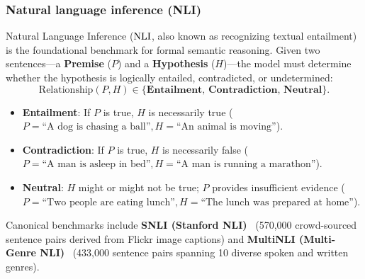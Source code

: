\documentclass[../../main.tex]{subfiles}
\begin{document}
\subsubsection{Natural language inference (NLI)}
\label{subsec:nli_reasoning}
Natural Language Inference ($\mathrm{NLI}$, also known as recognizing textual entailment) is the foundational benchmark for formal semantic reasoning. Given two sentences---a \textbf{Premise} ($P$) and a \textbf{Hypothesis} ($H$)---the model must determine whether the hypothesis is logically entailed, contradicted, or undetermined:
\begin{equation}
\label{eq:nli_labels}
\text{Relationship}(P, H) \in \{\textbf{Entailment}, \, \textbf{Contradiction}, \, \textbf{Neutral}\}.
\end{equation}
\begin{itemize}
    \item \textbf{Entailment}: If $P$ is true, $H$ is necessarily true ($P = \text{``A dog is chasing a ball''}, H = \text{``An animal is moving''}$).
    \item \textbf{Contradiction}: If $P$ is true, $H$ is necessarily false ($P = \text{``A man is asleep in bed''}, H = \text{``A man is running a marathon''}$).
    \item \textbf{Neutral}: $H$ might or might not be true; $P$ provides insufficient evidence ($P = \text{``Two people are eating lunch''}, H = \text{``The lunch was prepared at home''}$).
\end{itemize}
Canonical benchmarks include \textbf{SNLI (Stanford NLI)}~\cite{bowman2015snli} (570,000 crowd-sourced sentence pairs derived from Flickr image captions) and \textbf{MultiNLI (Multi-Genre NLI)}~\cite{williams2018multinli} (433,000 sentence pairs spanning 10 diverse spoken and written genres).
\end{document}
